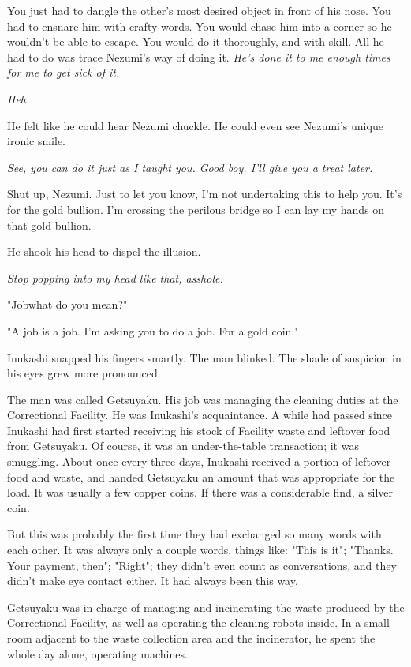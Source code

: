 You just had to dangle the other's most desired object in front of his
nose. You had to ensnare him with crafty words. You would chase him into
a corner so he wouldn't be able to escape. You would do it thoroughly,
and with skill. All he had to do was trace Nezumi's way of doing it.
\emph{He's done it to me enough times for me to get sick of it.}

\emph{Heh.}

He felt like he could hear Nezumi chuckle. He could even see Nezumi's
unique ironic smile.

\emph{See, you \emph{can} do it just as I taught you. Good boy. I'll give you a treat
later.}

Shut up, Nezumi. Just to let you know, I'm not undertaking this to help
you. It's for the gold bullion. I'm crossing the perilous bridge so I
can lay my hands on that gold bullion.

He shook his head to dispel the illusion.

\emph{Stop popping into my head like that, asshole.}

"Job\el what do you mean?"

"A job is a job. I'm asking you to do a job. For a gold coin."

Inukashi snapped his fingers smartly. The man blinked. The shade of
suspicion in his eyes grew more pronounced.

The man was called Getsuyaku. His job was managing the cleaning duties
at the Correctional Facility. He was Inukashi's acquaintance. A while
had passed since Inukashi had first started receiving his stock of
Facility waste and leftover food from Getsuyaku. Of course, it was an
under-the-table transaction; it was smuggling. About once every three
days, Inukashi received a portion of leftover food and waste, and handed
Getsuyaku an amount that was appropriate for the load. It was usually a
few copper coins. If there was a considerable find, a silver coin.

But this was probably the first time they had exchanged so many words
with each other. It was always only a couple words, things like: "This
is it"; "Thanks. Your payment, then"; "Right"; they didn't even count as
conversations, and they didn't make eye contact either. It had always
been this way.

Getsuyaku was in charge of managing and incinerating the waste produced
by the Correctional Facility, as well as operating the cleaning robots
inside. In a small room adjacent to the waste collection area and the
incinerator, he spent the whole day alone, operating machines.

